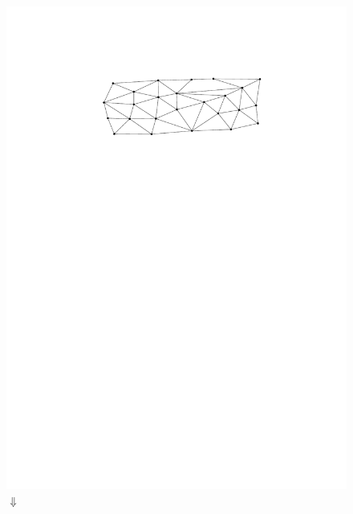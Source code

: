 \documentclass[a4paper,UKenglish,cleveref, autoref, thm-restate]{lipics-v2021}
\begin{document}
\begin{figure}
    \centering
    \includegraphics[page=3]{figs/proper_good}\\
    $\Downarrow$ \\

\end{figure}
\end{document}
